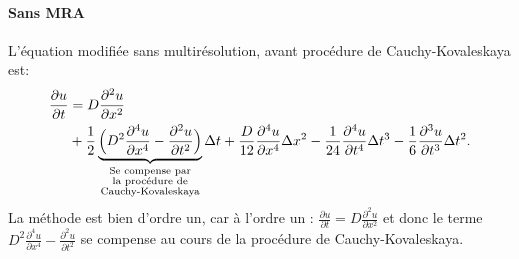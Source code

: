     \paragraph{Sans MRA}
        L'équation modifiée sans multirésolution, avant procédure de Cauchy-Kovaleskaya est:
        \begin{align}
            \frac{\partial u}{\partial t}  &= D \frac{\partial^{2} u}{\partial x^{2}} \\\notag
                &+ \frac{1}{2} \underbrace{\Bigl(D^{2}\frac{\partial^{4} u}{\partial x^{4}} - \frac{\partial^{2} u}{\partial t^{2}} \Bigr)}_{\substack{\text{Se compense par} \\ \text{la procédure de} \\ \text{Cauchy-Kovaleskaya}}} \Delta t
                + \frac{D}{12} \frac{\partial^{4} u}{\partial x^{4}}  \Delta x^{2}
                - \frac{1}{24} \frac{\partial^{4} u}{\partial t^{4}}  \Delta t^{3} 
                - \frac{1}{6}  \frac{\partial^{3} u}{\partial t^{3}}  \Delta t^{2}.
        \end{align}
        La méthode est bien d'ordre un, car à l'ordre un : $\frac{\partial u}{\partial t}  = D \frac{\partial^{2} u}{\partial x^{2}}$ et donc le terme $D^{2}\frac{\partial^{4} u}{\partial x^{4}} - \frac{\partial^{2} u}{\partial t^{2}}$
        se compense au cours de la procédure de Cauchy-Kovaleskaya.
